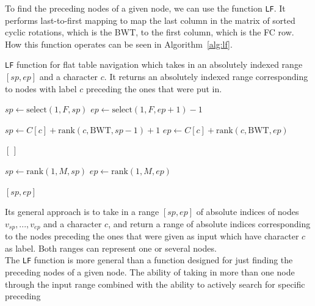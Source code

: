 \documentclass[a4paper,12pt,twoside,BCOR=10mm]{scrbook}
\begin{document}
To find the preceding nodes of a given node,
we can use the function \texttt{LF}. It performs last-to-first mapping to
map the last column in the matrix of sorted cyclic rotations, which is the BWT,
to the first column, which is the FC row.
How this function operates can be seen in Algorithm~\ref{alg:lf}.
\begin{algorithm}
\caption[\texttt{LF} function for flat table navigation]{\texttt{LF} function for flat table navigation which takes in an absolutely indexed range $ [ sp, ep ] $ and a character $ c $. It returns an absolutely indexed range corresponding to nodes with label $ c $ preceding the ones that were put in.}
\label{alg:lf}
\begin{algorithmic}[1]

\State $ sp \gets \textrm{select}(1, F, sp) $
\State $ ep \gets \textrm{select}(1, F, ep + 1) - 1 $

\State \phantom{nl}

\State $ sp \gets C [ c ] + \textrm{rank}(c, \textrm{BWT}, sp - 1) + 1 $
\State $ ep \gets C [ c ] + \textrm{rank}(c, \textrm{BWT}, ep) $

\State \phantom{nl}

	\State \Return $ [ \, ] $
\EndIf

\State \phantom{nl}

\State $ sp \gets \textrm{rank}(1, M, sp) $
\State $ ep \gets \textrm{rank}(1, M, ep) $

\State \phantom{nl}

\State \Return $ [ sp, ep ] $

\end{algorithmic}
\end{algorithm}
Its general approach is to take in a range $ [ sp, ep ] $ of absolute indices of
nodes $ v_{sp}, ..., v_{ep} $ and a character $ c $,
and return a range of absolute indices corresponding to the nodes
preceding the ones that were given as input which have character $ c $ as label.
Both ranges can represent one or several nodes. \\
The \texttt{LF} function is more general than a function designed for just finding the
preceding nodes of a given node. The ability of taking in more than one node through
the input range combined with the ability to actively search for specific preceding
\end{document}
